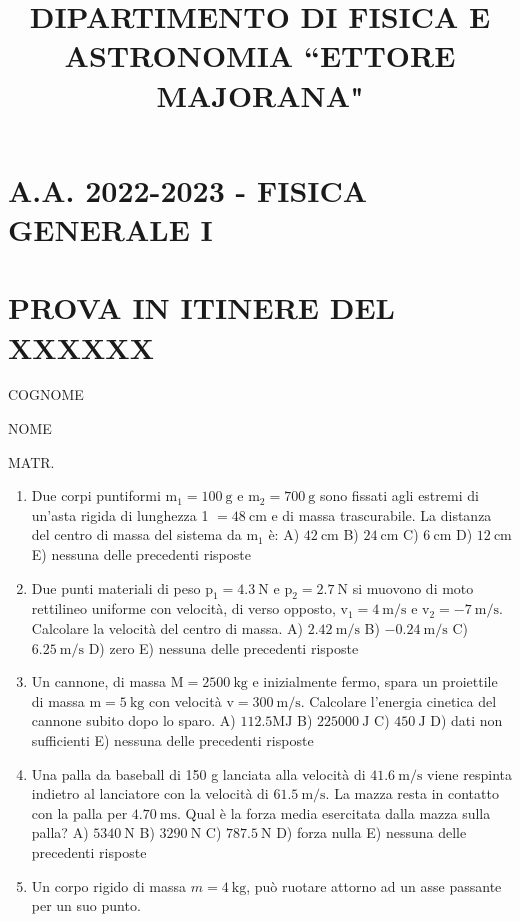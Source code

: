 \documentclass[10pt]{article}
\title{DIPARTIMENTO DI FISICA E ASTRONOMIA “ETTORE MAJORANA" }
\author{}
\date{}
\begin{document}
\maketitle
\section{A.A. 2022-2023 - FISICA GENERALE I}
\section{PROVA IN ITINERE DEL XXXXXX}
COGNOME

NOME

MATR.

\begin{enumerate}
  \item Due corpi puntiformi \(\mathrm{m}_{1}=100 \mathrm{~g}\) e \(\mathrm{m}_{2}=700 \mathrm{~g}\) sono fissati agli estremi di un'asta rigida di lunghezza 1 \(=48 \mathrm{~cm}\) e di massa trascurabile. La distanza del centro di massa del sistema da \(\mathrm{m}_{1}\) è:
A) \(42 \mathrm{~cm}\)
B) \(24 \mathrm{~cm}\)
C) \(6 \mathrm{~cm}\)
D) \(12 \mathrm{~cm}\)
E) nessuna delle precedenti risposte

  \item Due punti materiali di peso \(\mathrm{p}_{1}=4.3 \mathrm{~N}\) e \(\mathrm{p}_{2}=2.7 \mathrm{~N}\) si muovono di moto rettilineo uniforme con velocità, di verso opposto, \(\mathrm{v}_{1}=4 \mathrm{~m} / \mathrm{s}\) e \(\mathrm{v}_{2}=-7 \mathrm{~m} / \mathrm{s}\). Calcolare la velocità del centro di massa.
A) \(2.42 \mathrm{~m} / \mathrm{s}\)
B) \(-0.24 \mathrm{~m} / \mathrm{s}\)
C) \(6.25 \mathrm{~m} / \mathrm{s}\)
D) zero
E) nessuna delle precedenti risposte

  \item Un cannone, di massa \(\mathrm{M}=2500 \mathrm{~kg}\) e inizialmente fermo, spara un proiettile di massa \(\mathrm{m}=5 \mathrm{~kg}\) con velocità \(\mathrm{v}=300 \mathrm{~m} / \mathrm{s}\). Calcolare l'energia cinetica del cannone subito dopo lo sparo.
A) \(112.5 \mathrm{MJ}\)
B) \(225000 \mathrm{~J}\)
C) \(450 \mathrm{~J}\)
D) dati non sufficienti
E) nessuna delle precedenti risposte

  \item Una palla da baseball di 150 g lanciata alla velocità di \(41.6 \mathrm{~m} / \mathrm{s}\) viene respinta indietro al lanciatore con la velocità di \(61.5 \mathrm{~m} / \mathrm{s}\). La mazza resta in contatto con la palla per \(4.70 \mathrm{~ms}\). Qual è la forza media esercitata dalla mazza sulla palla?
A) \(5340 \mathrm{~N}\)
B) \(3290 \mathrm{~N}\)
C) \(787.5 \mathrm{~N}\)
D) forza nulla
E) nessuna delle precedenti risposte

  \item Un corpo rigido di massa \(m=4 \mathrm{~kg}\), può ruotare attorno ad un asse passante per un suo punto.

\end{enumerate}
\end{document}

